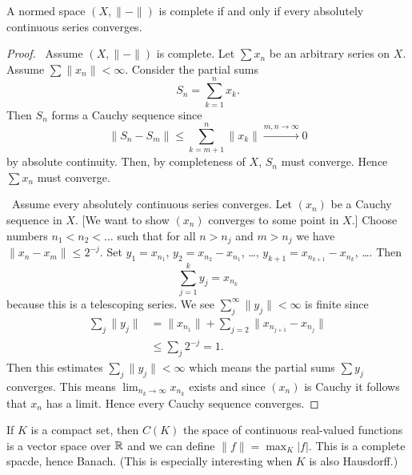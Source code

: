 \begin{theorem}
A normed space $(X,\|-\|)$ is complete if and only if every absolutely
continuous series converges.
\end{theorem}

\begin{proof}
\forwardproof\ Assume $(X,\|-\|)$ is complete. Let $\sum x_{n}$
be an arbitrary series on $X$. Assume $\sum\|x_{n}\|<\infty$. Consider
the partial sums
\begin{equation}
S_{n}=\sum^{n}_{k=1}x_{k}.
\end{equation}
Then $S_{n}$ forms a Cauchy sequence since
\begin{equation}
\|S_{n}-S_{m}\|\leq\sum^{n}_{k=m+1}\|x_{k}\|\xrightarrow{m,n\to\infty}0
\end{equation}
by absolute continuity. Then, by completeness of $X$, $S_{n}$ must
converge. Hence $\sum x_{n}$ must converge.

\backwardproof\ Assume every absolutely continuous series
converges. Let $(x_{n})$ be a Cauchy sequence in $X$. [We want to show
$(x_{n})$ converges to some point in $X$.]
Choose numbers $n_{1}<n_{2}<\dots$ such that for all $n>n_{j}$ and
$m>n_{j}$ we have $\|x_{n}-x_{m}\|\leq2^{-j}$. Set $y_{1}=x_{n_{1}}$,
$y_{2}=x_{n_{2}}-x_{n_{1}}$, \dots, $y_{k+1}=x_{n_{k+1}}-x_{n_{k}}$,
\dots. Then
\begin{equation}
\sum^{k}_{j=1}y_{j}=x_{n_{k}}
\end{equation}
because this is a telescoping series. We see $\sum_{j}^{\infty}\|y_{j}\|<\infty$ is finite
since
\begin{subequations}
  \begin{align}
\sum_{j}\|y_{j}\| &= \|x_{n_{1}}\| + \sum_{j=2}\|x_{n_{j+1}}-x_{n_{j}}\|\\
&\leq\sum_{j}2^{-j}=1.
  \end{align}
\end{subequations}
Then this estimates $\sum_{j}\|y_{j}\|<\infty$ which means the partial
sums $\sum y_{j}$ converges. This means $\lim_{n_{k}\to\infty} x_{n_{k}}$ exists
and since $(x_{n})$ is Cauchy it follows that $x_{n}$ has a
limit. Hence every Cauchy sequence converges.
\end{proof}

\begin{example}
If $K$ is a compact set, then $C(K)$ the space of continuous
real-valued functions is a vector space over $\mathbb{R}$ and we can define
$\|f\|=\max_{K}|f|$. This is a complete spacde, hence Banach. (This is
especially interesting when $K$ is also Hausdorff.)
\end{example}


